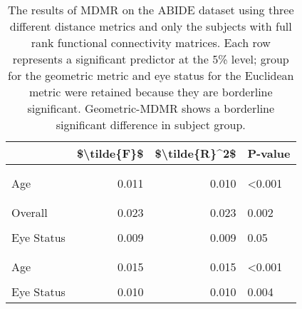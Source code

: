 \documentclass[
]{article}
\author{}
\date{\vspace{-2.5em}}
\begin{document}
\begin{table}[htbp]

\caption{\label{tab:abide_fullrank_tab}The results of MDMR on the ABIDE dataset using three different distance metrics and only the subjects with full rank functional connectivity matrices.  Each row represents a significant predictor at the 5\% level; group for the geometric metric and eye status for the Euclidean metric were retained because they are borderline significant.  Geometric-MDMR shows a borderline significant difference in subject group.}
\centering
\begin{tabular}[t]{lrrl}
\toprule
 & \$\textbackslash{}tilde\{F\}\$ & \$\textbackslash{}tilde\{R\}\textasciicircum{}2\$ & P-value\\
\midrule
\addlinespace[0.3em]
\multicolumn{4}{l}{\textbf{Geometric}}\\
\hspace{1em}\cellcolor{gray!6}{Overall} & \cellcolor{gray!6}{0.018} & \cellcolor{gray!6}{0.018} & \cellcolor{gray!6}{<0.001}\\
\hspace{1em}Age & 0.011 & 0.010 & <0.001\\
\hspace{1em}\cellcolor{gray!6}{Group} & \cellcolor{gray!6}{0.007} & \cellcolor{gray!6}{0.007} & \cellcolor{gray!6}{0.058}\\
\addlinespace[0.3em]
\multicolumn{4}{l}{\textbf{Euclidean}}\\
\hspace{1em}Overall & 0.023 & 0.023 & 0.002\\
\hspace{1em}\cellcolor{gray!6}{Age} & \cellcolor{gray!6}{0.014} & \cellcolor{gray!6}{0.014} & \cellcolor{gray!6}{0.004}\\
\hspace{1em}Eye Status & 0.009 & 0.009 & 0.05\\
\addlinespace[0.3em]
\multicolumn{4}{l}{\textbf{Correlation}}\\
\hspace{1em}\cellcolor{gray!6}{Overall} & \cellcolor{gray!6}{0.034} & \cellcolor{gray!6}{0.033} & \cellcolor{gray!6}{<0.001}\\
\hspace{1em}Age & 0.015 & 0.015 & <0.001\\
\hspace{1em}\cellcolor{gray!6}{Sex} & \cellcolor{gray!6}{0.008} & \cellcolor{gray!6}{0.008} & \cellcolor{gray!6}{0.04}\\
\hspace{1em}Eye Status & 0.010 & 0.010 & 0.004\\
\bottomrule
\end{tabular}
\end{table}
\end{document}
